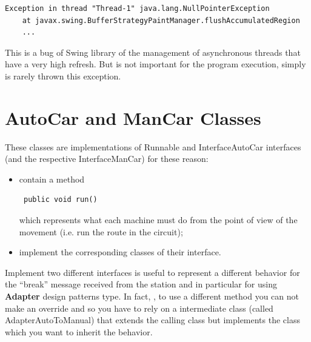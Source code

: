 \documentclass[a4paper,titlepage]{article}
\begin{document}
\begin{verbatim}
Exception in thread "Thread-1" java.lang.NullPointerException
	at javax.swing.BufferStrategyPaintManager.flushAccumulatedRegion
	...
\end{verbatim}

This is a bug of Swing library of the management of asynchronous threads that have a very high refresh. But is not important for the program execution, simply is rarely thrown this exception.

\newpage

\part{AutoCar and ManCar Classes}

These classes are implementations of Runnable and InterfaceAutoCar interfaces (and the respective InterfaceManCar) for these reason:

\begin {itemize}

\item contain a method \begin{verbatim} public void run() \end{verbatim} which represents what each machine must do from the point of view of the movement (i.e. run the route in the circuit);

\item implement the corresponding classes of their interface.

\end {itemize}

Implement two different interfaces is useful to represent a different behavior for the ``break'' message received from the station and in particular for using \textbf{Adapter} design patterns type. In fact, , to use a different method you can not make an override and so you have to rely on a intermediate class (called AdapterAutoToManual) that extends the calling class but implements the class which you want to inherit the behavior.
\end{document}
